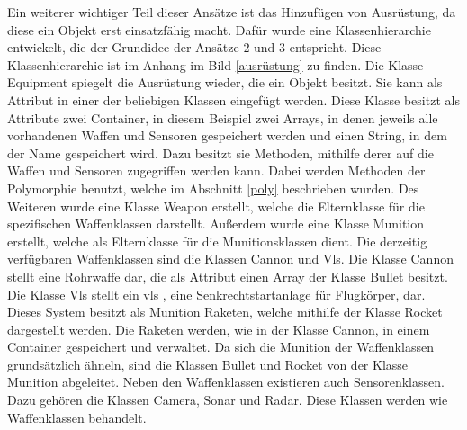 Ein weiterer wichtiger Teil dieser Ansätze ist das Hinzufügen von Ausrüstung, da diese ein Objekt erst einsatzfähig macht. Dafür wurde eine Klassenhierarchie entwickelt, die der Grundidee der Ansätze 2 und 3 entspricht. Diese Klassenhierarchie ist im Anhang im Bild \ref{ausrüstung} zu finden. Die Klasse \glqq Equipment\grqq{} spiegelt die Ausrüstung wieder, die ein Objekt besitzt. Sie kann als Attribut in einer der beliebigen Klassen eingefügt werden.  Diese Klasse besitzt als Attribute zwei Container, in diesem Beispiel zwei Arrays, in denen jeweils alle vorhandenen Waffen und Sensoren gespeichert werden und einen String, in dem der Name gespeichert wird.  Dazu besitzt sie Methoden, mithilfe derer auf die Waffen und Sensoren zugegriffen werden kann. Dabei werden Methoden der Polymorphie benutzt, welche im Abschnitt  \ref{poly} beschrieben wurden. Des Weiteren wurde eine Klasse \glqq Weapon\grqq{} erstellt, welche die Elternklasse für die spezifischen Waffenklassen darstellt. Außerdem wurde eine Klasse \glqq Munition\grqq{} erstellt, welche als Elternklasse für die Munitionsklassen dient. Die derzeitig verfügbaren Waffenklassen sind die Klassen \glqq Cannon\grqq{} und \glqq Vls\grqq{}. Die Klasse \glqq Cannon\grqq{} stellt eine Rohrwaffe dar, die als Attribut einen Array der Klasse  \glqq Bullet\grqq{} besitzt. Die Klasse \glqq Vls\grqq{} stellt ein  \ac{vls} , eine Senkrechtstartanlage für Flugkörper, dar. Dieses System besitzt als Munition Raketen, welche mithilfe der Klasse \glqq Rocket\grqq{} dargestellt werden.  Die Raketen werden, wie in der Klasse \glqq Cannon\grqq{}, in einem Container gespeichert und verwaltet. Da sich die Munition der Waffenklassen grundsätzlich ähneln, sind die Klassen \glqq Bullet\grqq{} und  \glqq Rocket\grqq{}  von der Klasse  \glqq Munition\grqq{} abgeleitet. Neben den Waffenklassen existieren auch Sensorenklassen. Dazu gehören die Klassen \glqq Camera\grqq{}, \glqq Sonar\grqq{} und \glqq Radar\grqq{}. Diese Klassen werden wie Waffenklassen behandelt. 
 
